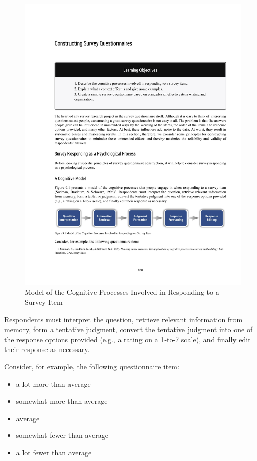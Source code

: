 \begin{figure}

\includegraphics[width=\linewidth]{figures/C9cognitivemodel.pdf}

\caption{Model of the Cognitive Processes Involved in Responding to a Survey Item}

\label{fig:cogmodel}

\end{figure}

Respondents must interpret the question, retrieve relevant information from memory, form a tentative judgment, convert the tentative judgment into one of the response options provided (e.g., a rating on a 1-to-7 scale), and finally edit their response as necessary.

Consider, for example, the following questionnaire item:

\color{fgcolor}\begin{kframe}
\begin{itemize}
\item a lot more than average
\item somewhat more than average
\item  average
\item  somewhat fewer than average
\item  a lot fewer than average
\end{itemize}
\end{kframe}

